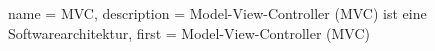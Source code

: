 






{
  name        = MVC,
  description = {Model-View-Controller (MVC) ist eine Softwarearchitektur},
  first       = {Model-View-Controller (MVC)}
}